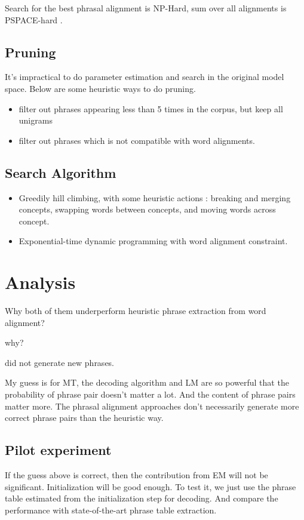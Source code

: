 \documentclass[11pt, letterpaper]{article}   	%
\begin{document}
Search for the best phrasal alignment is NP-Hard, sum over all alignments is PSPACE-hard \cite{denero-acl-08}.


\subsection{Pruning}
It's impractical to do parameter estimation and search in the original model space. Below are some heuristic ways to do pruning.
\begin{itemize}
\item filter out phrases appearing less than 5 times in the corpus, but keep all unigrams \cite{marcu-wong-02}
\item filter out phrases which is not compatible with word alignments. \cite{denero-06-wmt}
\end{itemize}

\subsection{Search Algorithm}
\begin{itemize}
\item Greedily hill climbing, with some heuristic actions : breaking and merging concepts, swapping words between concepts, and moving words across concept. \cite{marcu-wong-02}
\item Exponential-time dynamic programming with word alignment constraint.  \cite{denero-06-wmt}
\end{itemize}

\section{Analysis}
Why both of them underperform heuristic phrase extraction from word alignment?

\cite{marcu-wong-02} why?

\cite{denero-06-wmt} did not generate new phrases.

My guess is for MT, the decoding algorithm and LM are so powerful that the probability of phrase pair doesn't matter a lot. And the content of phrase pairs matter more. The phrasal alignment approaches don't necessarily generate more correct phrase pairs than the heuristic way.

\subsection{Pilot experiment}
If the guess above is correct, then the contribution from EM will not be significant. Initialization will be good enough. To test it, we just use the phrase table estimated from the initialization step for decoding. And compare the performance with state-of-the-art phrase table extraction. 
\end{document}
